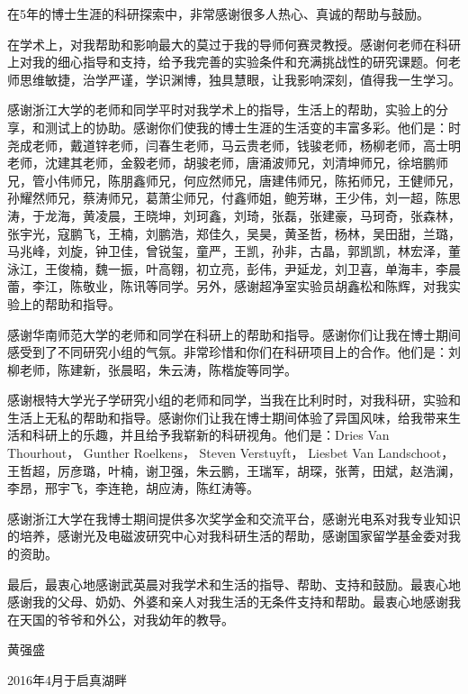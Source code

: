 \begin{thanks}
	
在5年的博士生涯的科研探索中，非常感谢很多人热心、真诚的帮助与鼓励。

在学术上，对我帮助和影响最大的莫过于我的导师何赛灵教授。感谢何老师在科研上对我的细心指导和支持，给予我完善的实验条件和充满挑战性的研究课题。何老师思维敏捷，治学严谨，学识渊博，独具慧眼，让我影响深刻，值得我一生学习。

感谢浙江大学的老师和同学平时对我学术上的指导，生活上的帮助，实验上的分享，和测试上的协助。感谢你们使我的博士生涯的生活变的丰富多彩。他们是：时尧成老师，戴道锌老师，闫春生老师，马云贵老师，钱骏老师，杨柳老师，高士明老师，沈建其老师，金毅老师，胡骏老师，唐涌波师兄，刘清坤师兄，徐培鹏师兄，管小伟师兄，陈朋鑫师兄，何应然师兄，唐建伟师兄，陈拓师兄，王健师兄，孙耀然师兄，蔡涛师兄，葛萧尘师兄，付鑫师姐，鲍芳琳，王少伟，刘一超，陈思涛，于龙海，黄凌晨，王晓坤，刘珂鑫，刘琦，张磊，张建豪，马珂奇，张森林，张宇光，寇鹏飞，王楠，刘鹏浩，郑佳久，吴昊，黄圣哲，杨林，吴田甜，兰璐，马兆峰，刘旋，钟卫佳，曾锐玺，童严，王凯，孙非，古晶，郭凯凯，林宏泽，董泳江，王俊楠，魏一振，叶高翱，初立亮，彭伟，尹延龙，刘卫喜，单海丰，李晨蕾，李江，陈敬业，陈讯等同学。另外，感谢超净室实验员胡鑫松和陈辉，对我实验上的帮助和指导。

感谢华南师范大学的老师和同学在科研上的帮助和指导。感谢你们让我在博士期间感受到了不同研究小组的气氛。非常珍惜和你们在科研项目上的合作。他们是：刘柳老师，陈建新，张晨昭，朱云涛，陈楷旋等同学。

感谢根特大学光子学研究小组的老师和同学，当我在比利时时，对我科研，实验和生活上无私的帮助和指导。感谢你们让我在博士期间体验了异国风味，给我带来生活和科研上的乐趣，并且给予我崭新的科研视角。他们是：Dries Van Thourhout， Gunther Roelkens， Steven Verstuyft， Liesbet Van Landschoot， 王哲超，厉彦璐，叶楠，谢卫强，朱云鹏，王瑞军，胡琛，张菁，田斌，赵浩澜，李昂，邢宇飞，李连艳，胡应涛，陈红涛等。

感谢浙江大学在我博士期间提供多次奖学金和交流平台，感谢光电系对我专业知识的培养，感谢光及电磁波研究中心对我科研生活的帮助，感谢国家留学基金委对我的资助。

最后，最衷心地感谢武英晨对我学术和生活的指导、帮助、支持和鼓励。最衷心地感谢我的父母、奶奶、外婆和亲人对我生活的无条件支持和帮助。最衷心地感谢我在天国的爷爷和外公，对我幼年的教导。

\begin{flushright}
	黄强盛
	
	2016年4月于启真湖畔
\end{flushright}
\thispagestyle{plain}
\end{thanks}
